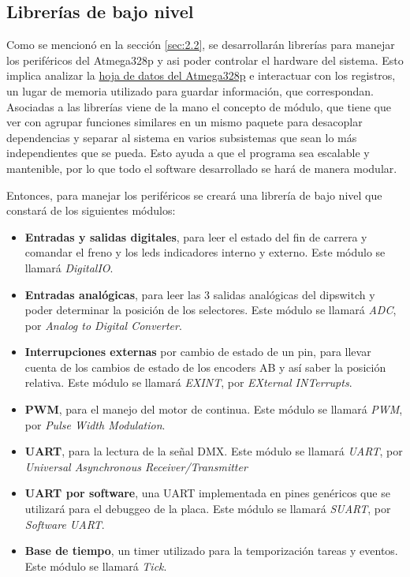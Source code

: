 \subsection{Librerías de bajo nivel}
Como se mencionó en la sección \ref{sec:2.2}, se desarrollarán librerías para manejar los periféricos del Atmega328p y asi poder controlar el hardware del sistema. Esto implica analizar la \href{http://www.atmel.com/Images/Atmel-42735-8-bit-AVR-Microcontroller-ATmega328-328P_Datasheet.pdf}{hoja de datos del Atmega328p} e interactuar con los registros, un lugar de memoria utilizado para guardar información, que correspondan.\\ 
Asociadas a las librerías viene de la mano el concepto de módulo, que tiene que ver con agrupar funciones similares en un mismo paquete para desacoplar dependencias y separar al sistema en varios subsistemas que sean lo más independientes que se pueda. Esto ayuda a que el programa sea escalable y mantenible, por lo que todo el software desarrollado se hará de manera modular.

Entonces, para manejar los periféricos se creará una librería de bajo nivel que constará de los siguientes módulos:
\begin{itemize}
	\item \textbf{Entradas y salidas digitales}, para leer el estado del fin de carrera y comandar el freno y los leds indicadores interno y externo. Este módulo se llamará \textit{DigitalIO}.
	\item \textbf{Entradas analógicas}, para leer las 3 salidas analógicas del dipswitch y poder determinar la posición de los selectores. Este módulo se llamará \textit{ADC}, por \textit{Analog to Digital Converter}.
	\item \textbf{Interrupciones externas} por cambio de estado de un pin, para llevar cuenta de los cambios de estado de los encoders AB y así saber la posición relativa. Este módulo se llamará \textit{EXINT}, por \textit{EXternal INTerrupts}.
	\item \textbf{PWM}, para el manejo del motor de continua. Este módulo se llamará \textit{PWM}, por \textit{Pulse Width Modulation}.
	\item \textbf{UART}, para la lectura de la señal DMX. Este módulo se llamará \textit{UART}, por \textit{Universal Asynchronous Receiver/Transmitter}
	\item \textbf{UART por software}, una UART implementada en pines genéricos que se utilizará para el debuggeo de la placa. Este módulo se llamará \textit{SUART}, por \textit{Software UART}.
	\item \textbf{Base de tiempo}, un timer utilizado para la temporización tareas y eventos. Este módulo se llamará \textit{Tick}.
\end{itemize}

